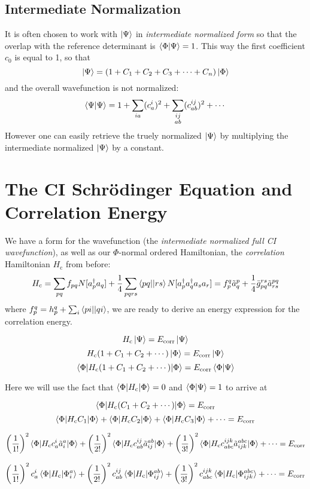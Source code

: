 \documentclass{article}
\newcommand{\lp}{\left(}
\newcommand{\rp}{\right)}
\newcommand{\Ecorr}{E_{\mathrm{corr}}}
\newcommand{\Hc}{H_{\mathrm{c}}}
\newcommand{\dg}{\ensuremath{^\dagger} }
\begin{document}
\subsection{Intermediate Normalization}
It is often chosen to work with $\ket{\Psi}$ in \textit{intermediate normalized form} so that the overlap with the reference determinant is $\braket{\Phi | \Psi} = 1$.  
This way the first coefficient $c_0$ is equal to 1, so that 
\[ \ket{\Psi} = \lp 1 + C_1 + C_2 + C_3 + \cdots + C_n \rp \ket{\Phi} \]
and the overall wavefunction is not normalized:
\[ \braket{\Psi|\Psi} = 1 + \sum_{ia} (c_a^i)^2 + \sum_{ \substack{ij \\ ab}} (c_{ab}^{ij})^2 + \cdots  \]
However one can easily retrieve the truely normalized $\ket{\Psi}$ by multiplying the intermediate normalized $\ket{\Psi}$ by a constant.


\section{The CI Schr{\"o}dinger Equation and Correlation Energy}
We have a form for the wavefunction (the \textit{intermediate normalized full CI wavefunction}), as well as our $\Phi$-normal ordered Hamiltonian, 
the \textit{correlation} Hamiltonian $\Hc$ from before:
\[\Hc =  \sum_{pq} f_{pq} N[a_p\dg a_q]  + \frac{1}{4} \sum_{pqrs} \braket{pq || rs} N[a_p\dg a_q\dg a_s a_r] = f_p^q \tilde{a}_q^p + \frac{1}{4} \bar{g}_{pq}^{rs} \tilde{a}_{rs}^{pq} \] 
where $f_{p}^{q} = h_{p}^{q} + \sum_i \braket{pi||qi} $,
we are ready to derive an energy expression for the correlation energy.

\[\Hc \ket{\Psi} = \Ecorr \ket{\Psi} \]
\[\Hc (1 + C_1 + C_2 + \cdots) \ket{\Phi} = \Ecorr \ket{\Psi} \]
\[\braket{\Phi | \Hc (1 + C_1 + C_2 + \cdots) | \Phi} = \Ecorr \braket{\Phi|\Psi} \]

Here we will use the fact that  $\braket{\Phi|\Hc|\Phi} = 0 $ and $\braket{\Phi|\Psi} = 1$ to arrive at

\[\braket{\Phi | \Hc (C_1 + C_2 + \cdots) | \Phi} = \Ecorr \]
\[ \braket{\Phi | \Hc C_1 | \Phi} + \braket{\Phi | \Hc C_2 | \Phi} + \braket{\Phi | \Hc C_3 | \Phi} + \cdots = \Ecorr \]

\[ \left(\frac{1}{1!}\right)^2 \braket{\Phi | \Hc c_a^i \tilde{a}_i^a  | \Phi}
+  \left(\frac{1}{2!}\right)^2 \braket{\Phi | \Hc c_{ab}^{ij} \tilde{a}_{ij}^{ab} | \Phi}
+  \left(\frac{1}{3!}\right)^2 \braket{\Phi | \Hc c_{abc}^{ijk} \tilde{a}_{ijk}^{abc} |\Phi} + \cdots = \Ecorr
\]

\[ \left(\frac{1}{1!}\right)^2 c_a^i \braket{\Phi | \Hc | \Phi_i^a}
+  \left(\frac{1}{2!}\right)^2 c_{ab}^{ij} \braket{\Phi | \Hc | \Phi_{ij}^{ab}}
+  \left(\frac{1}{3!}\right)^2 c_{abc}^{ijk} \braket{\Phi | \Hc |\Phi_{ijk}^{abc}} + \cdots = \Ecorr
\]
\end{document}
